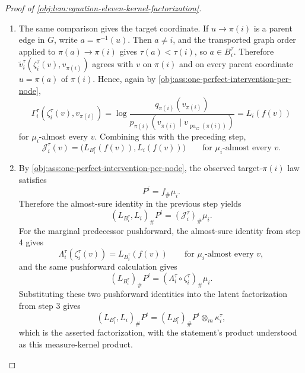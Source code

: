 \begin{proof}[Proof of \cref{obj:lem:equation-eleven-kernel-factorization}]
\begin{enumerate}
\item The same comparison gives the target coordinate. If \(u\to\pi(i)\) is a parent edge in \(G\), write \(a=\pi^{-1}(u)\). Then \(a\ne i\), and the transported graph order applied to \(\pi(a)\to\pi(i)\) gives \(\tau(a)<\tau(i)\), so \(a\in B_i^\tau\). Therefore \(\widetilde v_i^\tau(\zeta_i^\tau(v),v_{\pi(i)})\) agrees with \(v\) on \(\pi(i)\) and on every parent coordinate \(u=\pi(a)\) of \(\pi(i)\). Hence, again by \cref{obj:ass:one-perfect-intervention-per-node},
\[
\Gamma_i^\tau(\zeta_i^\tau(v),v_{\pi(i)})
=
\log
\frac{q_{\pi(i)}(v_{\pi(i)})}
{p_{\pi(i)}(v_{\pi(i)}\mid v_{\operatorname{pa}_G(\pi(i))})}
=
L_i(f(v))
\]
for \(\mu_i\)-almost every \(v\). Combining this with the preceding step,
\[
\mathcal J_i^\tau(v)
=
\bigl(L_{B_i^\tau}(f(v)),L_i(f(v))\bigr)
\qquad
\text{for \(\mu_i\)-almost every }v .
\] %

\item By \cref{obj:ass:one-perfect-intervention-per-node}, the observed target-\(\pi(i)\) law satisfies
\[
P^i=f_{\#}\mu_i .
\]
Therefore the almost-sure identity in the previous step yields
\[
(L_{B_i^\tau},L_i)_{\#}P^i
=
(\mathcal J_i^\tau)_{\#}\mu_i .
\]
For the marginal predecessor pushforward, the almost-sure identity from step 4 gives
\[
\Lambda_i^\tau(\zeta_i^\tau(v))
=
L_{B_i^\tau}(f(v))
\qquad
\text{for \(\mu_i\)-almost every }v,
\]
and the same pushforward calculation gives
\[
(L_{B_i^\tau})_{\#}P^i
=
(\Lambda_i^\tau\circ \zeta_i^\tau)_{\#}\mu_i .
\]
Substituting these two pushforward identities into the latent factorization from step 3 gives
\[
(L_{B_i^\tau},L_i)_{\#}P^i
=
(L_{B_i^\tau})_{\#}P^i\otimes_{\!m} \kappa_i^\tau,
\]
which is the asserted factorization, with the statement's product understood as this measure-kernel product. %
\end{enumerate}
\end{proof}
